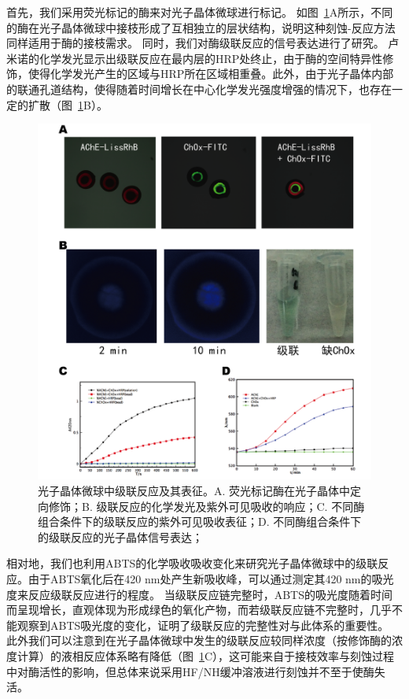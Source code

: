 首先，我们采用荧光标记的酶来对光子晶体微球进行标记。
如图~\ref{fig:cascade}A所示，不同的酶在光子晶体微球中接枝形成了互相独立的层状结构，说明这种刻蚀-反应方法同样适用于酶的接枝需求。
同时，我们对酶级联反应的信号表达进行了研究。
卢米诺的化学发光显示出级联反应在最内层的HRP处终止，由于酶的空间特异性修饰，使得化学发光产生的区域与HRP所在区域相重叠。此外，由于光子晶体内部的联通孔道结构，使得随着时间增长在中心化学发光强度增强的情况下，也存在一定的扩散（图~\ref{fig:cascade}B）。
\begin{figure}[htbp]
  \centering
  \includegraphics[width=\linewidth]{figures/ch5/cascade.png}
  \caption{光子晶体微球中级联反应及其表征。A. 荧光标记酶在光子晶体中定向修饰；B. 级联反应的化学发光及紫外可见吸收的响应；C. 不同酶组合条件下的级联反应的紫外可见吸收表征；D. 不同酶组合条件下的级联反应的光子晶体信号表达；}
  \label{fig:cascade}
\end{figure}

相对地，我们也利用ABTS的化学吸收吸收变化来研究光子晶体微球中的级联反应。由于ABTS氧化后在420 nm处产生新吸收峰，可以通过测定其420 nm的吸光度来反应级联反应进行的程度。
当级联反应链完整时，ABTS的吸光度随着时间而呈现增长，直观体现为形成绿色的氧化产物，而若级联反应链不完整时，几乎不能观察到ABTS吸光度的变化，证明了级联反应的完整性对与此体系的重要性。
此外我们可以注意到在光子晶体微球中发生的级联反应较同样浓度（按修饰酶的浓度计算）的液相反应体系略有降低（图~\ref{fig:cascade}C），这可能来自于接枝效率与刻蚀过程中对酶活性的影响，但总体来说采用HF/NH缓冲溶液进行刻蚀并不至于使酶失活。

